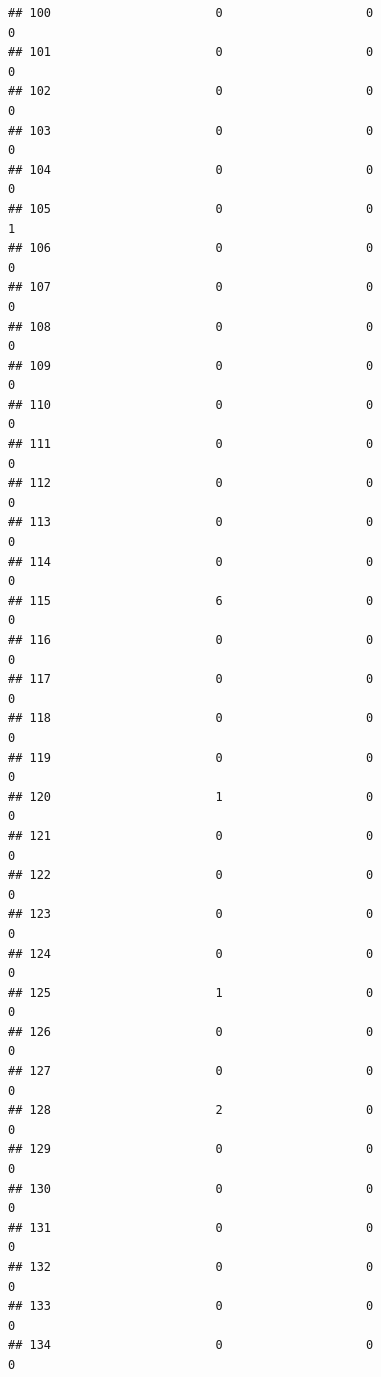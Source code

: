 \documentclass[
]{article}
\begin{document}
\begin{verbatim}
## 100                       0                    0                      0
## 101                       0                    0                      0
## 102                       0                    0                      0
## 103                       0                    0                      0
## 104                       0                    0                      0
## 105                       0                    0                      1
## 106                       0                    0                      0
## 107                       0                    0                      0
## 108                       0                    0                      0
## 109                       0                    0                      0
## 110                       0                    0                      0
## 111                       0                    0                      0
## 112                       0                    0                      0
## 113                       0                    0                      0
## 114                       0                    0                      0
## 115                       6                    0                      0
## 116                       0                    0                      0
## 117                       0                    0                      0
## 118                       0                    0                      0
## 119                       0                    0                      0
## 120                       1                    0                      0
## 121                       0                    0                      0
## 122                       0                    0                      0
## 123                       0                    0                      0
## 124                       0                    0                      0
## 125                       1                    0                      0
## 126                       0                    0                      0
## 127                       0                    0                      0
## 128                       2                    0                      0
## 129                       0                    0                      0
## 130                       0                    0                      0
## 131                       0                    0                      0
## 132                       0                    0                      0
## 133                       0                    0                      0
## 134                       0                    0                      0

\end{verbatim}
\end{document}
